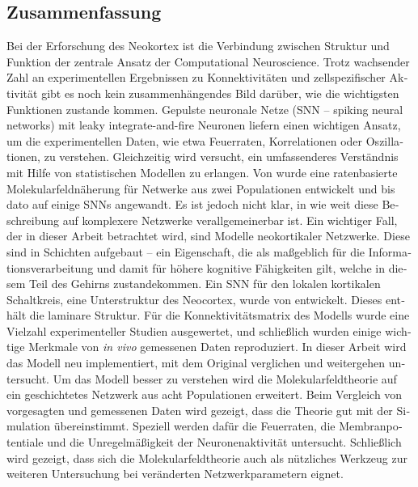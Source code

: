 \vfill

\pagebreak
\begin{otherlanguage}{ngerman}
\section*{Zusammenfassung}

Bei der Erforschung des Neokortex ist die Verbindung zwischen Struktur und 
Funktion der zentrale Ansatz der Computational Neuroscience. 
Trotz wachsender Zahl an experimentellen Ergebnissen zu 
Konnektivitäten und zellspezifischer Aktivität gibt es noch kein zusammenhängendes 
Bild darüber, wie die wichtigsten Funktionen zustande kommen. 
Gepulste neuronale Netze (SNN -- spiking neural networks) mit leaky integrate-and-fire
Neuronen liefern einen wichtigen Ansatz, um die experimentellen Daten, 
wie etwa Feuerraten, Korrelationen oder Oszillationen, zu verstehen. Gleichzeitig wird 
versucht, ein umfassenderes Verständnis mit Hilfe von statistischen Modellen 
zu erlangen. Von  wurde eine ratenbasierte Molekularfeldnäherung für
Netwerke aus zwei Populationen entwickelt und bis dato auf einige SNNs angewandt. 
Es ist jedoch nicht klar, in wie weit diese Beschreibung auf komplexere Netzwerke
verallgemeinerbar ist. Ein wichtiger Fall, der in dieser Arbeit betrachtet wird, 
sind Modelle neokortikaler Netzwerke. Diese sind in Schichten aufgebaut -- 
ein Eigenschaft, die als maßgeblich für die Informationsverarbeitung und damit für 
höhere kognitive Fähigkeiten gilt, welche in diesem Teil des Gehirns zustandekommen. 
Ein SNN für den lokalen kortikalen Schaltkreis, eine 
Unterstruktur des Neocortex, wurde von  entwickelt. Dieses
enthält die laminare Struktur. Für die Konnektivitätsmatrix des Modells 
wurde eine Vielzahl experimenteller Studien ausgewertet, und schließlich wurden
einige wichtige Merkmale von \textit{in vivo} gemessenen Daten reproduziert. 
In dieser Arbeit wird das Modell neu implementiert, mit dem Original verglichen 
und weitergehen untersucht. 
Um das Modell besser zu verstehen wird die 
Molekularfeldtheorie auf ein geschichtetes Netzwerk aus acht Populationen erweitert. 
Beim Vergleich von vorgesagten und gemessenen Daten wird gezeigt, dass die Theorie
gut mit der Simulation übereinstimmt. Speziell werden dafür die Feuerraten, die Membranpotentiale
und die Unregelmäßigkeit der Neuronenaktivität untersucht. Schließlich wird 
gezeigt, dass sich die Molekularfeldtheorie auch als nützliches Werkzeug zur weiteren Untersuchung 
bei veränderten Netzwerkparametern eignet. 

\end{otherlanguage}






\endgroup			

\vfill
